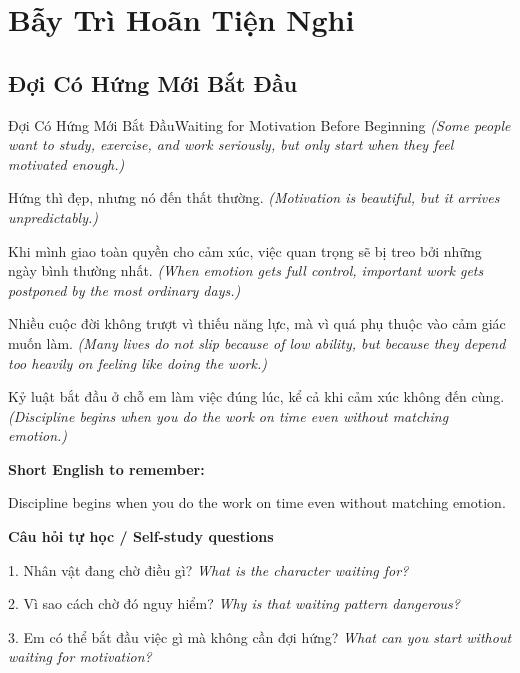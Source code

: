 \chapter{Bẫy Trì Hoãn Tiện Nghi}

\section{Đợi Có Hứng Mới Bắt Đầu}
\begin{truyen}{Đợi Có Hứng Mới Bắt Đầu}{Waiting for Motivation Before Beginning}
\textit{(Some people want to study, exercise, and work seriously, but only start when they feel motivated enough.)}

Hứng thì đẹp, nhưng nó đến thất thường.
\textit{(Motivation is beautiful, but it arrives unpredictably.)}

Khi mình giao toàn quyền cho cảm xúc, việc quan trọng sẽ bị treo bởi những ngày bình thường nhất.
\textit{(When emotion gets full control, important work gets postponed by the most ordinary days.)}

Nhiều cuộc đời không trượt vì thiếu năng lực, mà vì quá phụ thuộc vào cảm giác muốn làm.
\textit{(Many lives do not slip because of low ability, but because they depend too heavily on feeling like doing the work.)}

\end{truyen}

\begin{baihoc}
Kỷ luật bắt đầu ở chỗ em làm việc đúng lúc, kể cả khi cảm xúc không đến cùng.
\textit{(Discipline begins when you do the work on time even without matching emotion.)}
\end{baihoc}

\begin{ghinhoanh}
\textbf{Short English to remember:}

Discipline begins when you do the work on time even without matching emotion.

\end{ghinhoanh}

\begin{tuhocnhanh}
\textbf{Câu hỏi tự học / Self-study questions}

1. Nhân vật đang chờ điều gì? \textit{What is the character waiting for?}

2. Vì sao cách chờ đó nguy hiểm? \textit{Why is that waiting pattern dangerous?}

3. Em có thể bắt đầu việc gì mà không cần đợi hứng? \textit{What can you start without waiting for motivation?}
\end{tuhocnhanh}
\ngancach

